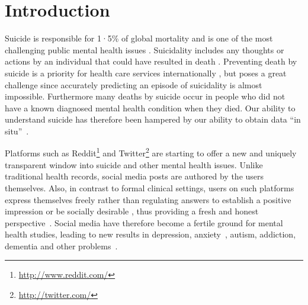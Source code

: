 \vspace{-8mm}
\section{Introduction}
Suicide is responsible for 1·5\% of global mortality and is one of the most challenging public mental health 
issues \cite{oconnor_psychology_2014}.
Suicidality includes any thoughts or actions by an individual that could have resulted in death \cite{turecki_suicide_2016}. 
Preventing death by suicide is a priority for health care services internationally \cite{zalsman_suicide_2016}, but poses a great challenge since accurately predicting an episode of suicidality is almost impossible\cite{mchugh2019,velupillai_risk_2019}. Furthermore many deaths by suicide occur in people who did not have a known diagnosed mental health condition when they died\cite{stone_vital_2018}. Our ability to understand suicide has therefore been hampered by our ability to obtain data ``in situ''~\cite{nock2019}.

Platforms such as Reddit\footnote{\url{http://www.reddit.com/}} and Twitter\footnote{\url{http://twitter.com/}} are starting to offer a new and uniquely transparent window into suicide and other mental health issues. Unlike traditional health records, social media posts are authored by the users themselves. Also, in contrast to formal clinical settings, users on such platforms express themselves freely rather than regulating answers to establish a positive impression or be socially desirable \cite{van_de_mortel_role_2008}, thus providing a fresh and honest perspective~\cite{gkotsis2017characterisation}. Social media have therefore become a fertile ground for mental health studies, leading to new results in depression\cite{}, anxiety~\cite{}, autism, addiction, dementia and other problems~\cite{de2014mental,park2018examining,shen2017detecting,park2017longitudinal,DeChoudhury2016,DeChoudhury2014}.
 
